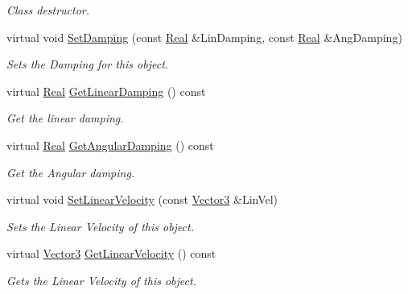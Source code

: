 \begin{DoxyCompactItemize}
\begin{DoxyCompactList}\small\item\em Class destructor. \item\end{DoxyCompactList}\item 
virtual void \hyperlink{classphys_1_1ActorRigidPhysicsSettings_abcb4e6a9ec828ac7f70075e5e70b529b}{SetDamping} (const \hyperlink{namespacephys_af7eb897198d265b8e868f45240230d5f}{Real} \&LinDamping, const \hyperlink{namespacephys_af7eb897198d265b8e868f45240230d5f}{Real} \&AngDamping)
\begin{DoxyCompactList}\small\item\em Sets the Damping for this object. \item\end{DoxyCompactList}\item 
virtual \hyperlink{namespacephys_af7eb897198d265b8e868f45240230d5f}{Real} \hyperlink{classphys_1_1ActorRigidPhysicsSettings_af81213793393bec576a60d943ff461d0}{GetLinearDamping} () const 
\begin{DoxyCompactList}\small\item\em Get the linear damping. \item\end{DoxyCompactList}\item 
virtual \hyperlink{namespacephys_af7eb897198d265b8e868f45240230d5f}{Real} \hyperlink{classphys_1_1ActorRigidPhysicsSettings_a91df099d9af175cc5f5a0f253c8e1f32}{GetAngularDamping} () const 
\begin{DoxyCompactList}\small\item\em Get the Angular damping. \item\end{DoxyCompactList}\item 
virtual void \hyperlink{classphys_1_1ActorRigidPhysicsSettings_a65cda21e8cd8837f057349d05de15f18}{SetLinearVelocity} (const \hyperlink{classphys_1_1Vector3}{Vector3} \&LinVel)
\begin{DoxyCompactList}\small\item\em Sets the Linear Velocity of this object. \item\end{DoxyCompactList}\item 
virtual \hyperlink{classphys_1_1Vector3}{Vector3} \hyperlink{classphys_1_1ActorRigidPhysicsSettings_adbd0280f78f4a40891d3130835e0111a}{GetLinearVelocity} () const 
\begin{DoxyCompactList}\small\item\em Gets the Linear Velocity of this object. \item\end{DoxyCompactList}\item 

\end{DoxyCompactItemize}
